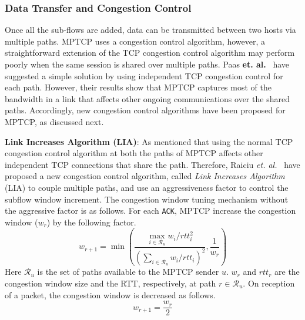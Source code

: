 %
%

\subsubsection{Data Transfer and Congestion Control}
Once all the sub-flows are added, data can be transmitted between two hosts via multiple paths. MPTCP uses a congestion control algorithm, however, a straightforward extension of the TCP congestion control algorithm may perform poorly when the same session is shared over multiple paths. Paas \textbf{et. al.}~\cite{PaaschMptcp} have suggested a simple solution by using independent TCP congestion control for each path. However, their results show that MPTCP captures most of the bandwidth in a link that affects other ongoing communications over the shared paths. Accordingly, new congestion control algorithms have been proposed for MPTCP, as discussed next. 

\textbf{Link Increases Algorithm (LIA)}: As mentioned that using the normal TCP congestion control algorithm at both the paths of MPTCP affects other independent TCP connections that share the path. Therefore, Raiciu \textit{et. al.}~\cite{LIARFC6356} have proposed a new congestion control algorithm, called {\em Link Increases Algorithm} (LIA) to couple multiple paths, and use an aggressiveness factor to control the subflow window increment. The congestion window tuning mechanism without the aggressive factor is as follows. For each \texttt{ACK}, MPTCP increase the congestion window ($w_r$) by the following factor. 
\begin{equation}
w_{r+1} = \min\left( \frac{\max\limits_{i \in \mathcal{R}_u} w_i/rtt_i^2}{\left(\sum_{i \in \mathcal{R}_u}w_i/rtt_i\right)^2}, \frac{1}{w_r}\right)
\end{equation}
Here $\mathcal{R}_u$ is the set of paths available to the MPTCP sender $u$. $w_r$ and $rtt_r$ are the congestion window size and the RTT, respectively, at path $r \in \mathcal{R}_u$. On reception of a packet, the congestion window is decreased as follows.
\begin{equation}
w_{r+1} = \frac{w_r}{2}
\end{equation}

